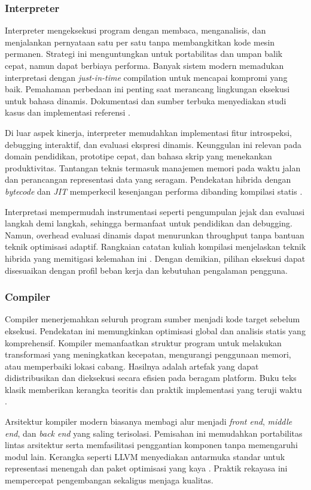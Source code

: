 \documentclass[../main.tex]{subfiles}
\begin{document}
\subsubsection{Interpreter}
Interpreter mengeksekusi program dengan membaca, menganalisis, dan menjalankan pernyataan satu per satu tanpa membangkitkan kode mesin permanen. Strategi ini menguntungkan untuk portabilitas dan umpan balik cepat, namun dapat berbiaya performa. Banyak sistem modern memadukan interpretasi dengan \emph{just-in-time} compilation untuk mencapai kompromi yang baik. Pemahaman perbedaan ini penting saat merancang lingkungan eksekusi untuk bahasa dinamis. Dokumentasi dan sumber terbuka menyediakan studi kasus dan implementasi referensi \citep{CS143}.

Di luar aspek kinerja, interpreter memudahkan implementasi fitur introspeksi, debugging interaktif, dan evaluasi ekspresi dinamis. Keunggulan ini relevan pada domain pendidikan, prototipe cepat, dan bahasa skrip yang menekankan produktivitas. Tantangan teknis termasuk manajemen memori pada waktu jalan dan perancangan representasi data yang seragam. Pendekatan hibrida dengan \emph{bytecode} dan \emph{JIT} memperkecil kesenjangan performa dibanding kompilasi statis \citep{CS143}.

Interpretasi mempermudah instrumentasi seperti pengumpulan jejak dan evaluasi langkah demi langkah, sehingga bermanfaat untuk pendidikan dan debugging. Namun, overhead evaluasi dinamis dapat menurunkan throughput tanpa bantuan teknik optimisasi adaptif. Rangkaian catatan kuliah kompilasi menjelaskan teknik hibrida yang memitigasi kelemahan ini \citep{CS143}. Dengan demikian, pilihan eksekusi dapat disesuaikan dengan profil beban kerja dan kebutuhan pengalaman pengguna.

\subsubsection{Compiler}
Compiler menerjemahkan seluruh program sumber menjadi kode target sebelum eksekusi. Pendekatan ini memungkinkan optimisasi global dan analisis statis yang komprehensif. Kompiler memanfaatkan struktur program untuk melakukan transformasi yang meningkatkan kecepatan, mengurangi penggunaan memori, atau memperbaiki lokasi cabang. Hasilnya adalah artefak yang dapat didistribusikan dan dieksekusi secara efisien pada beragam platform. Buku teks klasik memberikan kerangka teoritis dan praktik implementasi yang teruji waktu \citep{Mogensen2010,Wirth1996}.

Arsitektur kompiler modern biasanya membagi alur menjadi \emph{front end}, \emph{middle end}, dan \emph{back end} yang saling terisolasi. Pemisahan ini memudahkan portabilitas lintas arsitektur serta memfasilitasi penggantian komponen tanpa memengaruhi modul lain. Kerangka seperti LLVM menyediakan antarmuka standar untuk representasi menengah dan paket optimisasi yang kaya \citep{LLVMOverview}. Praktik rekayasa ini mempercepat pengembangan sekaligus menjaga kualitas.
\end{document}
